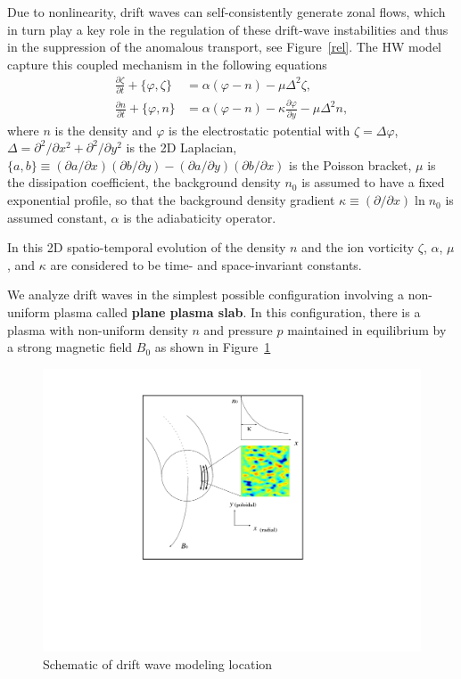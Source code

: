 \documentclass[12pt,lot, lof]{puthesis}
\begin{document}
Due to nonlinearity, drift waves can self-consistently generate zonal flows, which in turn play a key role in the regulation of these drift-wave instabilities and thus in the suppression of the anomalous transport, see Figure~{\ref{rel}}. The HW model \cite{Hasegawa1,Hasegawa2} capture this coupled mechanism in the following equations
\begin{subequations}
\label{HW1}
\begin{align}
	\frac{\partial \zeta}{\partial t}  + \{\varphi , \zeta \} &= \alpha ({\varphi}-{n}) - \mu \Delta^2 \zeta \label{MHWeqs1}	, \\	
	\frac{\partial n}{\partial t}  + \{\varphi , n\} &=  \alpha ({\varphi}-{n}) -\kappa \frac{\partial \varphi}{\partial y}- \mu \Delta^2 n,
\label{HW2}	
\end{align}
\end{subequations}
where $n$ is the density and $\varphi$ is the electrostatic potential with $\zeta = \Delta \varphi$, $\Delta = \partial ^2 / \partial x^2+ \partial ^2 / \partial y^2$ is the 2D Laplacian, $\{a,b\} \equiv  \left( \partial a /\partial x  \right)\left( \partial b /\partial y \right)  -\left( \partial a /\partial y  \right)\left( \partial b /\partial x \right) $ is the Poisson bracket, $\mu$ is the dissipation coefficient, the background density $n_0$ is assumed to have a fixed exponential profile, so that the background density gradient  $\kappa \equiv  \left( \partial  /\partial x \right) \ln n_0$ is assumed constant, $\alpha $ is the adiabaticity operator.

In this 2D spatio-temporal evolution of the density $n$ and the ion vorticity $\zeta$, $\alpha$, $\mu$, and $\kappa$ are considered to be time- and space-invariant constants.

We analyze drift waves in the simplest possible configuration involving a non-uniform plasma called \textbf{plane plasma slab}. In this configuration, there is a plasma with non-uniform density $n$ and pressure $p$ maintained in equilibrium by a strong magnetic field $B_0$ as shown in Figure~\ref{waka1}

\begin{figure}[htbp]
\centering
\includegraphics[width= 0.6\linewidth]{waka1}
\caption{Schematic of drift wave modeling location }
\label{waka1}
\end{figure}
\end{document}

